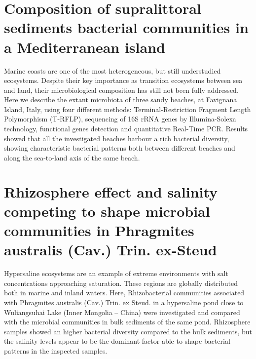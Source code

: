 \section[Composition of supralittoral sediments bacterial communities in a Mediterranean island]{Composition of supralittoral sediments bacterial communities in a Mediterranean island%
}

Marine coasts are one of the most heterogeneous, but still understudied ecosystems. Despite their key importance as transition ecosystems between sea and land, their microbiological composition has still not been fully addressed. Here we describe the extant microbiota of three sandy beaches, at Favignana Island, Italy, using four different methods: Terminal-Restriction Fragment Length Polymorphism (T-RFLP), sequencing of 16S rRNA genes by Illumina-Solexa technology, functional genes detection and quantitative Real-Time PCR. Results showed that all the investigated beaches harbour a rich bacterial diversity, showing characteristic bacterial patterns both between different beaches and along the sea-to-land axis of the same beach.\\

\newpage

\newpage

\section[Rhizosphere effect and salinity competing to shape microbial communities in Phragmites australis (Cav.) Trin. ex-Steud]{Rhizosphere effect and salinity competing to shape microbial communities in Phragmites australis (Cav.) Trin. ex-Steud%
}

Hypersaline ecosystems are an example of extreme environments with salt concentrations approaching saturation. These regions are globally distributed both in marine and inland waters. Here, Rhizobacterial communities associated with Phragmites australis (Cav.) Trin. ex Steud. in a hypersaline pond close to Wuliangsuhai Lake (Inner Mongolia – China) were investigated and compared with the microbial communities in bulk sediments of the same pond. Rhizosphere samples showed an higher bacterial diversity compared to the bulk sediments, but the salinity levels appear to be the dominant factor able to shape bacterial patterns in the inspected samples.\\

